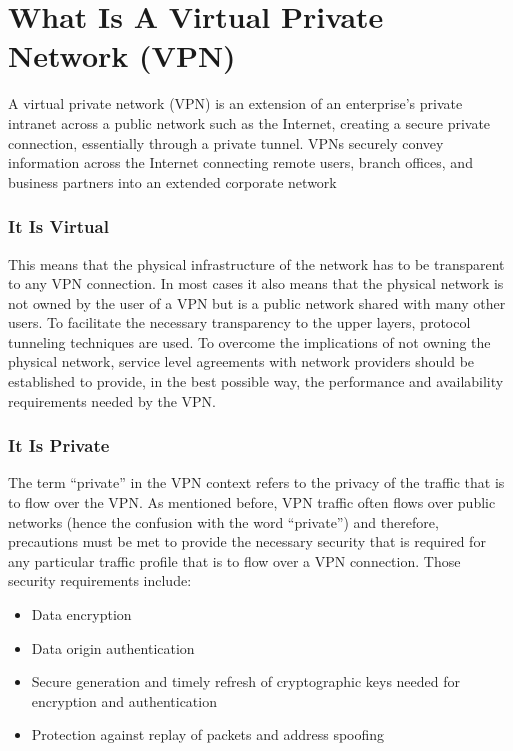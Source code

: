 \documentclass[10pt,a4paper]{article}
\author{Austin Vern Songer}
\begin{document}
\tableofcontents
\newpage
\part{What Is A Virtual Private Network (VPN)}
A virtual private network (VPN) is an extension of an enterprise's private intranet
across a public network such as the Internet, creating a secure private
connection, essentially through a private tunnel. VPNs securely convey
information across the Internet connecting remote users, branch offices, and
business partners into an extended corporate network

\section{It Is Virtual}
This means that the physical infrastructure of the network has to be
transparent to any VPN connection. In most cases it also means that the
physical network is not owned by the user of a VPN but is a public network
shared with many other users. To facilitate the necessary transparency to the
upper layers, protocol tunneling techniques are used. To overcome the
implications of not owning the physical network, service level agreements with
network providers should be established to provide, in the best possible way,
the performance and availability requirements needed by the VPN.



\section{It Is Private}
The term “private” in the VPN context refers to the privacy of the traffic that is
to flow over the VPN. As mentioned before, VPN traffic often flows over public
networks (hence the confusion with the word “private”) and therefore,
precautions must be met to provide the necessary security that is required for
any particular traffic profile that is to flow over a VPN connection. Those
security requirements include:

\begin{itemize}
\item Data encryption
\item Data origin authentication
\item Secure generation and timely refresh of cryptographic keys needed for
encryption and authentication
\item Protection against replay of packets and address spoofing
\end{itemize}
\end{document}
